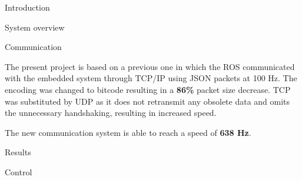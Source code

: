 \documentclass[a0paper,landscape]{baposter}
\begin{document}
\begin{poster}
\begin{posterbox}[name=intro,column=0]{Introduction}

\end{posterbox}

\begin{posterbox}[name=methods,column=0,below=intro]{System overview}

\begin{center}
 

\end{center}

\end{posterbox}

\begin{posterbox}[name=asd,below=methods,above=bottom]{Communication}
	
The present project is based on a previous one in which the ROS communicated with the embedded system through TCP/IP using JSON packets at 100 Hz. 
The encoding was changed to bitcode resulting in a \textbf{86\%} packet size decrease. TCP was substituted by UDP as it does not retransmit any obsolete data and omits the unnecessary handshaking, resulting in increased speed.

\begin{center}
	\label{tab:UDPMeasurements}
\end{center}
The new communication system is able to reach a speed of \textbf{638 Hz}. 
	
\end{posterbox}


\begin{posterbox}[name=results,span=1,column=2,row=0]{Results}
	
\end{posterbox}

\begin{posterbox}[name=Control,column=1]{Control}


\begin{center}
     
    

\end{center}
\end{posterbox}
\end{poster}
\end{document}
